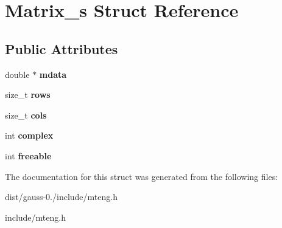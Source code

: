 \hypertarget{struct_matrix__s}{\section{Matrix\-\_\-s Struct Reference}
\label{struct_matrix__s}
}
\subsection*{Public Attributes}
\begin{DoxyCompactItemize}
\item 
\hypertarget{struct_matrix__s_a8ae3686823c7bb1118e87e0c4b0b21f5}{double $\ast$ {\bfseries mdata}}\label{struct_matrix__s_a8ae3686823c7bb1118e87e0c4b0b21f5}

\item 
\hypertarget{struct_matrix__s_aaa2baac3c3b46f3462b7fb3b51dfcc36}{size\-\_\-t {\bfseries rows}}\label{struct_matrix__s_aaa2baac3c3b46f3462b7fb3b51dfcc36}

\item 
\hypertarget{struct_matrix__s_a7841ff826868fc4ad17e7a700cd2bb19}{size\-\_\-t {\bfseries cols}}\label{struct_matrix__s_a7841ff826868fc4ad17e7a700cd2bb19}

\item 
\hypertarget{struct_matrix__s_aee2a53199a417843872bc7bf486c5864}{int {\bfseries complex}}\label{struct_matrix__s_aee2a53199a417843872bc7bf486c5864}

\item 
\hypertarget{struct_matrix__s_a33aa2ae550c9dc0e1c9e6b0510d559c7}{int {\bfseries freeable}}\label{struct_matrix__s_a33aa2ae550c9dc0e1c9e6b0510d559c7}

\end{DoxyCompactItemize}


The documentation for this struct was generated from the following files\-:\begin{DoxyCompactItemize}
\item 
dist/gauss-\/0./include/mteng.\-h\item 
include/mteng.\-h\end{DoxyCompactItemize}
